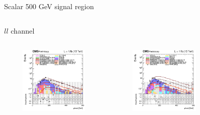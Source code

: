 \documentclass[8pt]{beamer}
\begin{document}
\begin{frame}{Scalar 500 GeV signal region}
\begin{columns}
\begin{column}{1.09\textwidth}
\begin{block}{\centering $ll$ channel}\end{block}
\end{column}
\end{columns} \vspace{-5pt}
\begin{columns}
		\begin{column}{0.33\textwidth}
			\begin{center}
			\vspace{-8pt}
			\begin{block}{}\end{block}\vspace{10pt}
     			\includegraphics[width=1.0\textwidth, height=90pt]{figs/2016/log_cratio_topCR_ll_DNN_signal0_scalar500_METcorrected_pt.png}
    		\end{center}		
		\end{column} 
		\begin{column}{0.33\textwidth}
			\begin{center}
			\vspace{-8pt}
			\begin{block}{}\end{block}\vspace{10pt}
     			\includegraphics[width=1.0\textwidth, height=90pt]{figs/2017/log_cratio_topCR_ll_DNN_signal0_scalar500_METcorrected_pt.png}
    		\end{center}		
		\end{column} 
		\begin{column}{0.33\textwidth}
			\begin{center}

\end{center}
\end{column}
\end{columns}
\end{frame}
\end{document}
